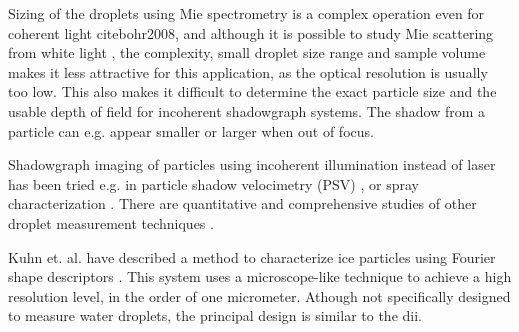 Sizing of the droplets using Mie spectrometry is a complex operation even for coherent light cite{bohr2008}, and although it is possible to study Mie scattering from white light \cite{ward2008}, the complexity, small droplet size range and sample volume makes it less attractive for this application, as the optical resolution is usually too low. This also makes it difficult to determine the exact particle size and the usable depth of field for incoherent shadowgraph systems. The shadow from a particle can e.g. appear smaller or larger when out of focus.

Shadowgraph imaging of particles using incoherent illumination instead of laser has been tried e.g. in particle shadow velocimetry (PSV) \cite{este2005}, or spray characterization \cite{will2010}. There are quantitative and comprehensive studies of other droplet measurement techniques \cite{dye1984,henn2013,conno2007}.

Kuhn et. al. \cite{kuhn2012} have described a method to characterize ice particles using Fourier shape descriptors \cite{gran1972,walla1980}. This system uses a microscope-like technique to achieve a high resolution level, in the order of one micrometer. Athough not specifically designed to measure water droplets, the principal design is similar to the \gls{dii}. 



